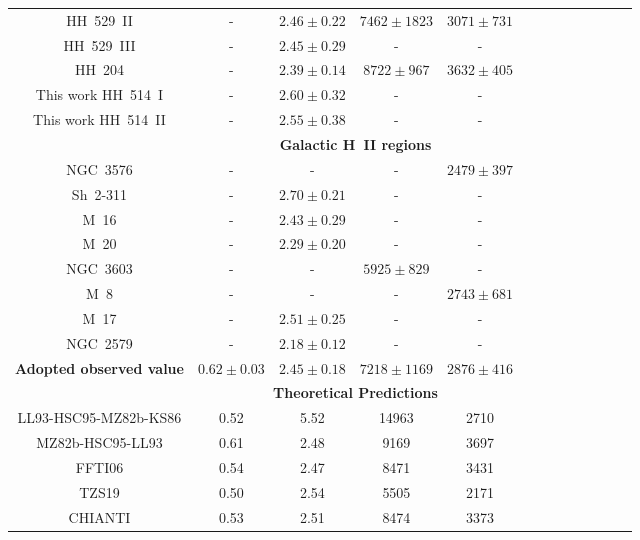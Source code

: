 \documentclass[fleqn,usenatbib]{mnras}
\begin{document}
\begin{table}
\begin{tabular}{ccccccccccccc}
\citet{mendez2021} HH~529~II &-&$2.46 \pm 0.22$&$7462 \pm 1823$&$3071 \pm 731$\\

\citet{mendez2021} HH~529~III &-&$2.45 \pm 0.29$ & - & -\\


\citet{mendez2021-2} HH~204 & - & $2.39 \pm 0.14$ & $8722 \pm 967$ & $3632 \pm 405$\\

This work HH~514~I & - & $2.60 \pm 0.32$ &-&-\\

This work HH~514~II & - & $2.55 \pm 0.38$ &-&-\\

 & \multicolumn{4}{c}{{\bf Galactic H~II regions}}\\

\citet{garciarojas04} NGC~3576 & -& - & - & $2479 \pm 397$ \\

\citet{garciarojas05} Sh~2-311& - & $2.70\pm 0.21$&-&-\\

\citet{garciarojas06} M~16 &-&$ 2.43\pm 0.29$&-&-\\

\citet{garciarojas06} M~20 & -& $ 2.29\pm 0.20$&-&-\\

\citet{garciarojas06} NGC~3603 & - & - & $5925 \pm 829$ & - \\

\citet{garciarojas07-2} M~8 &-& - &- & $2743 \pm 681$  \\

\citet{garciarojas07-2} M~17 &-& $2.51 \pm 0.25$ &-&-\\

\citet{Esteban13} NGC~2579 &- &$2.18 \pm 0.12$ &-&-\\



{\bf Adopted observed value} & \boldmath $0.62 \pm 0.03$ & \boldmath $2.45 \pm 0.18$& \boldmath$ 7218\pm 1169$ & \boldmath $2876\pm416$\\

 & \multicolumn{4}{c}{{\bf Theoretical Predictions}}\\

LL93-HSC95-MZ82b-KS86 &0.52& 5.52&14963&2710\\

MZ82b-HSC95-LL93  & 0.61 & 2.48 &9169&3697\\

FFTI06 &0.54& 2.47&8471&3431\\

TZS19 & 0.50 & 2.54&5505&2171\\

CHIANTI & 0.53 & 2.51&8474&3373\\

\hline
\end{tabular}
\end{table}
\end{document}
